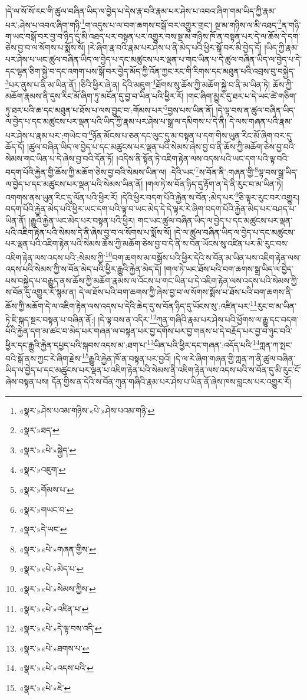 །དེ་ལ་སོ་སོ་རང་གི་ཚུལ་བཞིན་ཡིད་ལ་བྱེད་པ་དེས་རྣ་བའི་རྣམ་པར་ཤེས་པ་འབའ་ཞིག་གམ་ཡིད་ཀྱི་རྣམ་པར་:ཤེས་པ་འབའ་ཞིག་གཉི་\footnote{«སྣར་»ཤེས་པའམ་གཉིས་«པེ་»ཤེས་པའམ་གཉི་}ག་འདུས་པ་ལ་བག་ཆགས་བསྒོ་བར་འགྱུར་གྲང་། སྔ་མ་གཉིས་ལ་མི་འཐད་\footnote{«སྣར་»ཐད་}ན་གཉི་ག་ཡང་བསྒོ་བར་བྱ་བ་ཉིད་དུ་མི་འཐད་པར་བསྟན་པར་འགྱུར་བས་སྔ་མ་གཉིས་ཁོ་ན་བསྟན་པར་དེ་ལ་ཆོས་དེ་དག་ཅེས་བྱ་བ་ལ་སོགས་པ་སྨོས་སོ། །རེ་ཞིག་རྣ་བའི་རྣམ་པར་ཤེས་པ་ནི་མེད་པའི་ཕྱིར་སྒོ་བར་མི་བྱེད་དོ། །ཡིད་ཀྱི་རྣམ་པར་ཤེས་པ་ཡང་ཚུལ་བཞིན་ཡིད་ལ་བྱེད་པ་དང་མཚུངས་པར་ལྡན་པ་གང་ཡིན་པ་དེ་ཚུལ་བཞིན་ཡིད་ལ་བྱེད་པ་དེ་དང་ལྷན་ཅིག་སྐྱེ་བ་དང་འགག་པས་སྒོ་བར་བྱེད་མོད་ཀྱི་འོན་ཀྱང་རང་གི་རིགས་དང་མཐུན་པའི་འབྲས་བུ་བསྐྱེད་\footnote{«སྣར་»«པེ་»སྐྱེད་}པར་ནུས་པ་ནི་མ་ཡིན་ནོ། །ཅིའི་ཕྱིར་ཞེ་ན། དེའི་མཇུག་\footnote{«སྣར་»འཇུག་}ཐོགས་སུ་ཆོས་ཀྱི་མཆོག་སྐྱེ་བ་ནི་མ་ཡིན་ཏེ། ཆོས་ཀྱི་མཆོག་རྣམས་ནི་དུས་རིང་མོ་ཞིག་ཏུ་མངོན་དུ་བྱ་བ་ཡིན་པའི་ཕྱིར་རོ། །གང་ཞིག་མྱུར་དུ་ཐར་པ་དེ་ཡང་ཚེ་གཅིག་ཏུ་ཐར་པའི་ཆ་དང་མཐུན་པ་ཐོས་པ་ལས་བྱུང་བ་:གོམས་པར་\footnote{«སྣར་»གོམས་པ་}བྱས་པས་ཡིན་ནོ། །དེ་ལྟ་བས་ན་ཚུལ་བཞིན་ཡིད་ལ་བྱེད་པ་དང་མཚུངས་པར་ལྡན་པའི་ཡིད་ཀྱི་རྣམ་པར་ཤེས་པ་སྒྲ་ལ་དམིགས་པ་དེ་ནི། དེ་ལས་གཞན་པའི་རྣམ་པར་ཤེས་པ་རྣམ་པར་:གཡེང་བ་\footnote{«སྣར་»གཡང་བ་}ཉོན་མོངས་པ་ཅན་དང་ལུང་དུ་མ་བསྟན་པ་དག་གིས་ཡུན་རིང་མོ་ཞིག་བར་དུ་ཆོད་དོ། །ཚུལ་བཞིན་ཡིད་ལ་བྱེད་པ་དང་མཚུངས་པར་ལྡན་པའི་སེམས་ཞེས་བྱ་བ་ནི་ཆོས་ཀྱི་མཆོག་ཅེས་བྱ་བའི་སེམས་གང་ཡིན་པ་དེ་ཞེས་བྱ་བའི་དོན་ཏོ། །འདིས་ནི་སྟོན་ཏེ་འཇིག་རྟེན་ལས་འདས་པའི་ཡང་དག་པའི་ལྟ་བའི་བདག་པོའི་རྐྱེན་གྱི་ཆོས་ཀྱི་མཆོག་ཅེས་བྱ་བའི་སེམས་ཡིན་ལ། :དེའི་ཡང་\footnote{«སྣར་»དེ་ཡང་}ས་བོན་ནི་:གཞན་གྱི་\footnote{«སྣར་»«པེ་»གཞན་གྱིས་}ལྟ་བས་སྒྲ་ཡིད་ལ་བྱེད་པ་དང་མཚུངས་པར་ལྡན་པའི་སེམས་ཡིན་ནོ། །གལ་ཏེ་ས་བོན་ཉིད་དུ་རྟོག་ན་དེ་ནི་རུང་བ་མ་ཡིན་ཏེ། འགགས་ནས་ཡུན་རིང་དུ་ལོན་པའི་ཕྱིར་རོ། །དེའི་ཕྱིར་བདག་པོའི་རྐྱེན་ས་བོན་:མེད་པར་\footnote{«སྣར་»«པེ་»མེད་པ་}ཅི་ལྟར་རུང་བར་འགྱུར། བདག་པོའི་རྐྱེན་མེད་པའི་ཕྱིར་ཡང་དག་པའི་ལྟ་བ་ཡང་མེད་དེ་དེ་ལྟར་རེ་ཞིག་བདག་པོའི་རྐྱེན་མེད་པར་བཤད་པ་ཡིན་ནོ། །རྒྱུའི་རྐྱེན་ཡང་མེད་པར་བསྟན་པའི་ཕྱིར། གང་ཡང་ཚུལ་བཞིན་ཡིད་ལ་བྱེད་པ་དང་མཚུངས་པར་ལྡན་པའི་འཇིག་རྟེན་པའི་སེམས་དེ་ནི་ཞེས་བྱ་བ་ལ་སོགས་པ་སྨོས་སོ། །དེ་ལ་ཚུལ་བཞིན་ཡིད་ལ་བྱེད་པ་དང་མཚུངས་པར་ལྡན་པའི་འཇིག་རྟེན་པའི་སེམས་ཆོས་ཀྱི་མཆོག་ཅེས་བྱ་བ་དེ་ནི་ས་བོན་ཡོངས་སུ་འཛིན་པར་མི་རུང་བས་འཇིག་རྟེན་ལས་འདས་པའི་:སེམས་ཀྱི་\footnote{«སྣར་»«པེ་»སེམས་ཀྱིས་}བག་ཆགས་མ་བསྒོས་པའི་ཕྱིར་དེའི་ས་བོན་མ་ཡིན་པས་འཇིག་རྟེན་ལས་འདས་པའི་སེམས་ཀྱི་ས་བོན་མེད་པའི་ཕྱིར་རྒྱུའི་རྐྱེན་མེད་དོ། །གལ་ཏེ་ཡང་ཐོས་པའི་བག་ཆགས་སྒྲ་ཡིད་ལ་བྱེད་པས་བསྐྱེད་པ་བརྒྱུད་ནས་ཆོས་ཀྱི་མཆོག་རྣམས་ལ་འོངས་པ་གང་ཡིན་པ་དེ་འཇིག་རྟེན་ལས་འདས་པའི་སེམས་ཀྱི་ས་བོན་དུ་འགྱུར་རོ་སྙམ་ན། དེ་ལ་ཐོས་པའི་བག་ཆགས་ཀྱི་ཞེས་བྱ་བ་ལ་སོགས་སྨོས་པ་ཐོས་པའི་བག་ཆགས་ནི་ཆོས་ཀྱི་མཆོག་དེ་ལ་འཇིག་རྟེན་ལས་འདས་པ་དེའི་ཆེད་དུ་ས་བོན་ཉིད་དུ་ཡོངས་སུ་:འཛིན་པར་\footnote{«སྣར་»«པེ་»འཛིན་པ་}རུང་བ་མ་ཡིན་ཏེ་ཇི་སྐད་སྔར་བསྟན་པ་བཞིན་ནོ:། །དེ་ལྟ་བས་ན་འདིར་\footnote{«སྣར་»«པེ་»དེ་ལྟ་བས་འདི་}ཀུན་གཞིའི་རྣམ་པར་ཤེས་པའི་ཕྱོགས་ལ་རྒྱུ་དང་བདག་པོའི་རྐྱེན་དག་མ་ཚང་བ་མེད་པར་གཞན་ལ་བསྟན་པར་བྱ་དགོས་པར་བྱ་གནས་པ་དེ་བརྗོད་པར་བྱ་བ་ཉུང་བའི་ཕྱིར་དང་རྒྱུའི་རྐྱེན་དཔྱད་པའི་སྐབས་འདས་མ་:ཐག་པ་\footnote{«སྣར་»«པེ་»ཐགས་པ་}ཡིན་པའི་ཕྱིར་དང་གཞན་:འདོད་པའི་\footnote{«སྣར་»«པེ་»འདས་པའི་}ཀླན་ཀ་སྤང་བའི་སྒོ་ནས་ཀྱང་རེ་ཞིག་རྗེས་\footnote{«སྣར་»«པེ་»ཇེ་}རྒྱུའི་རྐྱེན་ཁོ་ན་བསྟན་པར་བྱའོ། །དེ་ལ་རེ་ཞིག་གཞན་གྱི་ཀླན་ཀ་ནི་ཚུལ་བཞིན་ཡིད་ལ་བྱེད་པ་དང་མཚུངས་པར་ལྡན་པ་འཇིག་རྟེན་པའི་སེམས་ནི་འཇིག་རྟེན་ལས་འདས་པའི་ས་བོན་དུ་མི་རུང་ངོ་ཞེས་བསྟན་པས། དོན་གྱིས་ན་དེའི་ས་བོན་ཀུན་གཞིའི་རྣམ་པར་ཤེས་པ་ཡིན་ནོ་ཞེས་ཁས་བླངས་པར་འགྱུར་རོ། 